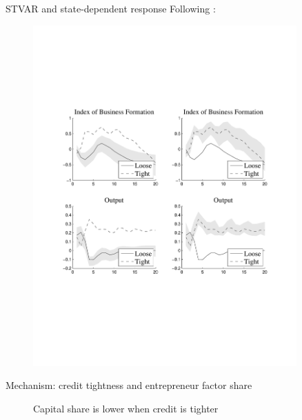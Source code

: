 \documentclass[svgnames]{beamer}
\begin{document}
\begin{frame}{STVAR and state-dependent response}
Following \citet{auerbach_measuring_2012}:
\begin{figure}[!ht]
\includegraphics[trim=1cm 6.5cm 1cm 6.5cm, clip=true, width=0.9\textwidth]{graph/GShockResStateData.pdf}
\end{figure}
\end{frame}

\begin{frame}{Mechanism: credit tightness and entrepreneur factor share}
\begin{figure}%
    \centering
    \qquad
    \caption{Capital share is lower when credit is tighter}%
    \label{fig:example}%
\end{figure}
\end{frame}
\end{document}
